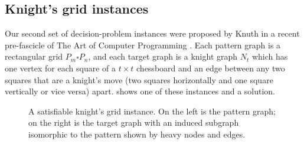 \FloatBarrier

\subsection{Knight's grid instances}

Our second set of decision-problem instances were proposed by Knuth in a recent pre-fascicle
of The Art of Computer Programming \cite{knuth2022art}.  Each pattern graph is a rectangular grid
$P_m \square P_n$, and each target graph is a knight graph $N_t$ which has one vertex for each
square of a $t \times t$ chessboard and an edge between any two squares that are a knight's
move (two squares horizontally and one square vertically or vice versa) apart.
 shows one of these instances and a solution.

\begin{figure}[htb]
    \centering
    \caption{A satisfiable knight's grid instance. On the left is the pattern graph; on the right
            is the target graph with an induced subgraph isomorphic to the pattern shown by heavy
            nodes and edges.}\label{figure:knights-example}
\end{figure}


